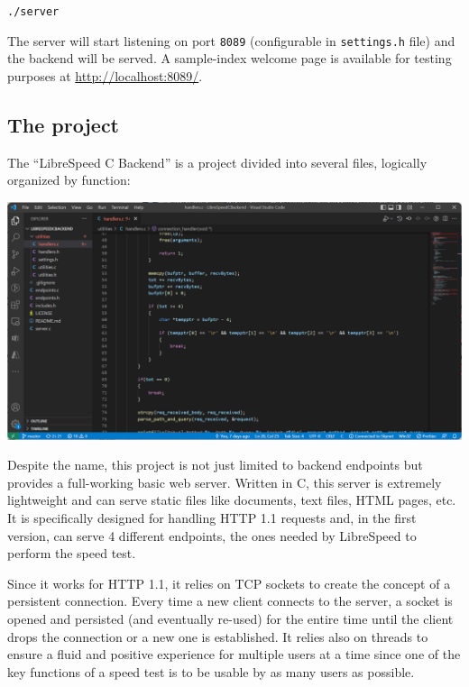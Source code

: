 \documentclass{article}
\begin{document}
\texttt{./server}

The server will start listening on port \texttt{8089} (configurable in \texttt{settings.h} file) and the backend will be served. A sample-index welcome page is available for testing purposes at \href{http://localhost:8089/}{http://localhost:8089/}.

\subsection{The project}
The “LibreSpeed C Backend” is a project divided into several files, logically organized by function:

\begin{center}
\begin{minipage}{12cm}
\includegraphics[width=\textwidth]{13-function}
\end{minipage}
\end{center}

Despite the name, this project is not just limited to backend endpoints but provides a full-working basic web server. Written in C, this server is extremely lightweight and can serve static files like documents, text files, HTML pages, etc. It is specifically designed for handling HTTP 1.1 requests and, in the first version, can serve 4 different endpoints, the ones needed by LibreSpeed to perform the speed test.

Since it works for HTTP 1.1, it relies on TCP sockets to create the concept of a persistent connection. Every time a new client connects to the server, a socket is opened and persisted (and eventually re-used) for the entire time until the client drops the connection or a new one is established. It relies also on threads to ensure a fluid and positive experience for multiple users at a time since one of the key functions of a speed test is to be usable by as many users as possible.
\end{document}
